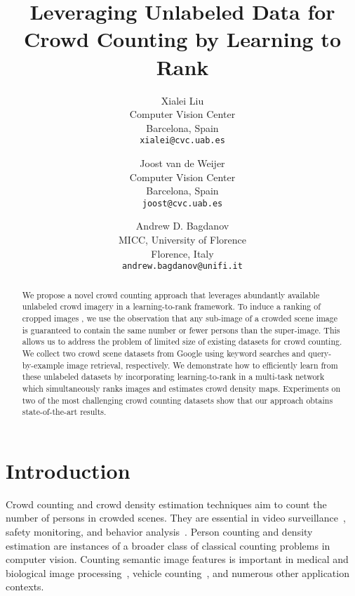 \documentclass[10pt,twocolumn,letterpaper]{article}
\begin{document}
\title{Leveraging Unlabeled Data for Crowd Counting by Learning to Rank}

\author{Xialei Liu\\
Computer Vision Center \\
Barcelona, Spain\\
{\tt\small xialei@cvc.uab.es}
\and
Joost van de Weijer\\
Computer Vision Center\\
Barcelona, Spain\\
{\tt\small joost@cvc.uab.es}
\and
Andrew D. Bagdanov\\
MICC, University of Florence \\
Florence, Italy\\
{\tt\small andrew.bagdanov@unifi.it}
}

\maketitle


\begin{abstract}
  We propose a novel crowd counting approach that
  leverages abundantly available unlabeled crowd imagery in a
  learning-to-rank framework. To induce a ranking of cropped images
, we use the  observation that any sub-image of a crowded scene image is guaranteed to contain the same number or fewer persons than the
  super-image. This allows us to address the problem of limited size
  of existing datasets for crowd counting.  We collect two crowd scene
  datasets from Google using keyword searches and query-by-example
  image retrieval, respectively. We demonstrate how to efficiently
  learn from these unlabeled datasets by incorporating
  learning-to-rank in a multi-task network which simultaneously ranks
  images and estimates crowd density maps.  Experiments on two of the
  most challenging crowd counting datasets show that our approach
  obtains state-of-the-art results.
\end{abstract}

\section{Introduction}

Crowd counting and crowd density estimation techniques aim to count
the number of persons in crowded scenes. They are essential in video
surveillance~\cite{chan2008privacy}, safety monitoring, and behavior analysis~\cite{sheng2016crowd}. Person counting and density estimation are instances of a broader class of classical counting problems in computer vision. Counting semantic image features is important in medical and biological image processing~\cite{lempitsky2010learning}, vehicle counting~\cite{onoro2016towards}, and numerous other application contexts.
\end{document}
